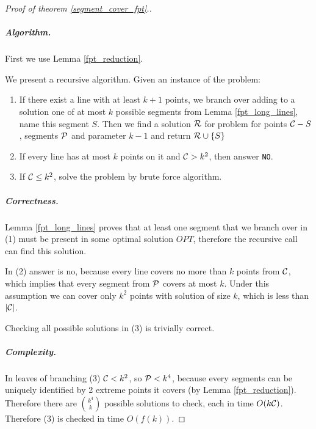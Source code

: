 \begin{proof}[Proof of theorem \ref{segment_cover_fpt}.]\leavevmode



\subparagraph{Algorithm.}
First we use Lemma \ref{fpt_reduction}.

We present a recursive algorithm. Given an instance of the problem:

\begin{enumerate}[label={(\arabic*)}]
\item If there exist a line with at least $k+1$ points, we branch over
adding to a solution one of at most $k$ possible segments
from Lemma \ref{fpt_long_lines}, name this segment $S$.
Then we find a solution $\mathcal{R}$
for problem for points $\mathcal{C} - S$, segments $\mathcal{P}$
and parameter $k-1$ and return $\mathcal{R} \cup \{S\}$
\item If every line has at most $k$ points on it and $\mathcal{C} > k^2$,
then answer \texttt{NO}.
\item If $\mathcal{C} \le k^2$, solve the problem by brute force algorithm.
\end{enumerate}

\subparagraph{Correctness.}

Lemma \ref{fpt_long_lines} proves that at least one segment that we
branch over in (1) must be present in some optimal solution $OPT$,
therefore the recursive call can find this solution.

In (2) answer is no, because every line covers no more than $k$ points
from $\mathcal{C}$, which implies that every segment from $\mathcal{P}$ covers at most
$k$. Under this assumption
we can cover only $k^2$ points with solution of size $k$, which is less
than $|\mathcal{C}|$.

Checking all possible solutions in (3) is trivially correct.


\subparagraph{Complexity.}

In leaves of branching (3) $\mathcal{C} < k^2$, so $\mathcal{P} < k^4$, because
every segments can be uniquely identified by 2 extreme points it covers
(by Lemma \ref{fpt_reduction}). Therefore there are $\binom{k^4}{k}$
possible solutions to check, each in time $O(k\mathcal{C})$.
Therefore (3) is checked in time $O(f(k))$.



\end{proof}

